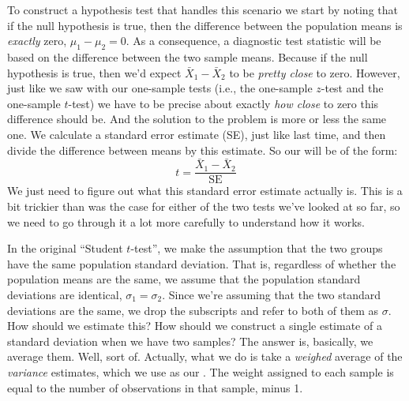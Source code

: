 To construct a hypothesis test that handles this scenario we start by noting that if the null hypothesis is true, then the difference between the population means is {\it exactly} zero, 
$\mu_1 - \mu_2 = 0$. As a consequence, a diagnostic test statistic will be based on the difference between the two sample means. Because if the null hypothesis is true, then we'd expect 
$\bar{X}_1 - \bar{X}_2$ to be {\it pretty close} to zero. However, just like we saw with our one-sample tests (i.e., the one-sample $z$-test and the one-sample $t$-test) we have to be precise about exactly {\it how close} to zero this difference should be. And the solution to the problem is more or less the same one. We calculate a standard error estimate (SE), just like last time, and then divide the difference between means by this estimate. So our  will be of the form:
$$
t = \frac{\bar{X}_1 - \bar{X}_2}{\mbox{SE}}
$$
We just need to figure out what this standard error estimate actually is. This is a bit trickier than was the case for either of the two tests we've looked at so far, so we need to go through it a lot more carefully to understand how it works.


In the original ``Student $t$-test'', we make the assumption that the two groups have the same population standard deviation. That is, regardless of whether the population means are the same, we assume that the population standard deviations are identical, $\sigma_1 = \sigma_2$. Since we're assuming that the two standard deviations are the same, we drop the subscripts and refer to both of them as $\sigma$. How should we estimate this? How should we construct a single estimate of a standard deviation when we have two samples? The answer is, basically, we average them. Well, sort of. Actually, what we do is take a {\it weighed} average of the {\it variance} estimates, which we use as our . The weight assigned to each sample is equal to the number of observations in that sample, minus 1. 

